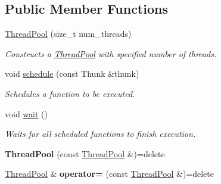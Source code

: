 \subsection*{Public Member Functions}
\begin{DoxyCompactItemize}
\item 
\mbox{\label{classnta_1_1utils_1_1ThreadPool_a3336e668eb283fcb65654058a9ed9113}} 
\hyperlink{classnta_1_1utils_1_1ThreadPool_a3336e668eb283fcb65654058a9ed9113}{Thread\+Pool} (size\+\_\+t num\+\_\+threads)
\begin{DoxyCompactList}\small\item\em Constructs a \hyperlink{classnta_1_1utils_1_1ThreadPool}{Thread\+Pool} with specified number of threads. \end{DoxyCompactList}\item 
\mbox{\label{classnta_1_1utils_1_1ThreadPool_aa10c18b44db7449d04bb6577c70dc17b}} 
void \hyperlink{classnta_1_1utils_1_1ThreadPool_aa10c18b44db7449d04bb6577c70dc17b}{schedule} (const Thunk \&thunk)
\begin{DoxyCompactList}\small\item\em Schedules a function to be executed. \end{DoxyCompactList}\item 
\mbox{\label{classnta_1_1utils_1_1ThreadPool_a267245d18bf040ebfb469cdce5221516}} 
void \hyperlink{classnta_1_1utils_1_1ThreadPool_a267245d18bf040ebfb469cdce5221516}{wait} ()
\begin{DoxyCompactList}\small\item\em Waits for all scheduled functions to finish execution. \end{DoxyCompactList}\item 
\mbox{\label{classnta_1_1utils_1_1ThreadPool_a3d928faed613a53dd61509dd8c10cf7a}} 
{\bfseries Thread\+Pool} (const \hyperlink{classnta_1_1utils_1_1ThreadPool}{Thread\+Pool} \&)=delete
\item 
\mbox{\label{classnta_1_1utils_1_1ThreadPool_ac8f40f413b950d44672128dd9b51e5c7}} 
\hyperlink{classnta_1_1utils_1_1ThreadPool}{Thread\+Pool} \& {\bfseries operator=} (const \hyperlink{classnta_1_1utils_1_1ThreadPool}{Thread\+Pool} \&)=delete
\end{DoxyCompactItemize}
